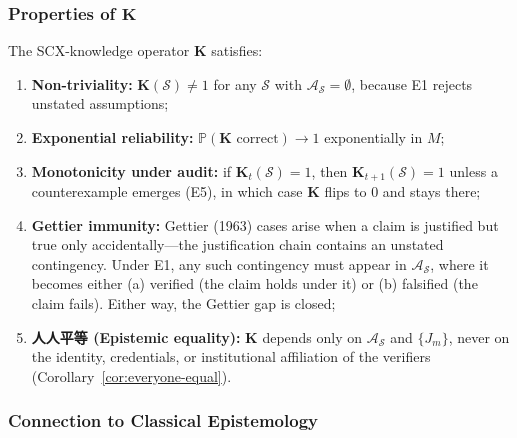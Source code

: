 \subsubsection{Properties of $\mathbf{K}$}
\label{sec:K-properties}

\begin{corollary}
\label{cor:K-properties}
The SCX-knowledge operator $\mathbf{K}$ satisfies:
\begin{enumerate}[label=(\roman*)]
  \item \textbf{Non-triviality:} $\mathbf{K}(\mathcal{S}) \neq 1$ for any
    $\mathcal{S}$ with $\mathcal{A}_{\mathcal{S}}=\emptyset$, because
    E1 rejects unstated assumptions;
  \item \textbf{Exponential reliability:}
    $\mathbb{P}(\mathbf{K} \text{ correct}) \to 1$ exponentially in $M$;
  \item \textbf{Monotonicity under audit:} if $\mathbf{K}_t(\mathcal{S})=1$,
    then $\mathbf{K}_{t+1}(\mathcal{S})=1$ unless a counterexample emerges
    (E5), in which case $\mathbf{K}$ flips to $0$ and stays there;
  \item \textbf{Gettier immunity:} Gettier (1963) cases arise when a claim
    is justified but true only accidentally---the justification chain
    contains an unstated contingency. Under E1, any such contingency must
    appear in $\mathcal{A}_{\mathcal{S}}$, where it becomes either (a)
    verified (the claim holds under it) or (b) falsified (the claim
    fails). Either way, the Gettier gap is closed;
  \item \textbf{人人平等 (Epistemic equality):} $\mathbf{K}$ depends only
    on $\mathcal{A}_{\mathcal{S}}$ and $\{J_m\}$, never on the identity,
    credentials, or institutional affiliation of the verifiers
    (Corollary~\ref{cor:everyone-equal}).
\end{enumerate}
\end{corollary}

\subsubsection{Connection to Classical Epistemology}
\label{sec:epistemic-classical}

